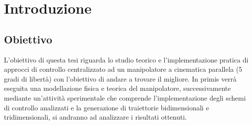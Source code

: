 \section{Introduzione}

\subsection{Obiettivo}
L'obiettivo di questa tesi riguarda lo studio teorico e l'implementazione pratica di approcci di controllo centralizzato ad un manipolatore a cinematica parallela (5 gradi di libertà) con l'obiettivo di andare a trovare il migliore. In primis verrà eseguita una modellazione fisica e teorica del manipolatore, successivamente mediante un'attività sperimentale che comprende l'implementazione degli schemi di controllo analizzati e la generazione di traiettorie bidimensionali e tridimensionali, si andranno ad analizzare i risultati ottenuti.
